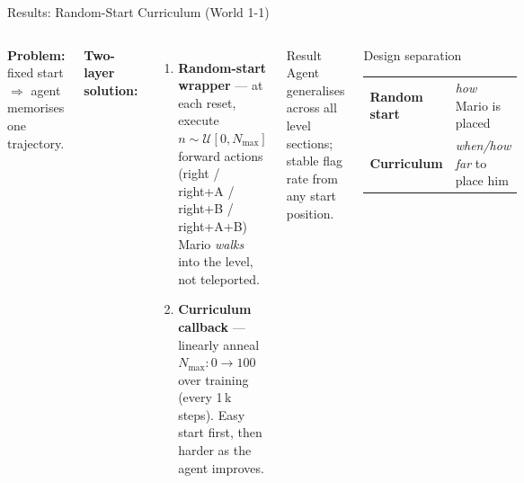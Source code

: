 \documentclass[aspectratio=169, 12pt]{beamer}
\begin{document}
\begin{frame}{Results: Random-Start Curriculum (World 1-1)}
\begin{columns}[T]
\textbf{Problem:} fixed start $\Rightarrow$ agent memorises one trajectory.

\vspace{6pt}
\textbf{Two-layer solution:}
\begin{enumerate}
  \item \textbf{Random-start wrapper} --- at each reset, execute
        $n \sim \mathcal{U}[0, N_{\max}]$ forward actions\\
        {\small(right / right+A / right+B / right+A+B)}\\
        Mario \emph{walks} into the level, not teleported.
  \item \textbf{Curriculum callback} --- linearly anneal
        $N_{\max}: 0 \to 100$ over training (every 1\,k steps). Easy start first, then harder as the agent improves.
\end{enumerate}

\vspace{6pt}
\begin{exampleblock}{Result}
Agent generalises across all level sections;\\
stable flag rate from any start position.
\end{exampleblock}

\begin{block}{Design separation}
\small
\begin{tabular}{p{1.6cm}p{2.5cm}}
  \toprule
  \textbf{Random start} & \emph{how} Mario is placed \\
  \textbf{Curriculum}   & \emph{when/how far} to place him \\
  \bottomrule
\end{tabular}
\end{block}
\end{columns}
\end{frame}
\end{document}
